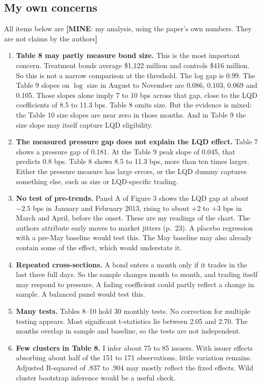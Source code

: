 \documentclass[10pt,a4paper]{article}
\newcommand{\MY}[1]{\textcolor{cmy}{\textbf{[MINE}: #1\textbf{]}}}
\begin{document}
\subsection{My own concerns}
All items below are \MY{my analysis, using the paper's own numbers. They are not claims by the authors}
\begin{enumerate}
\item \textbf{Table 8 may partly measure bond size.} This is the most important concern. Treatment bonds average \$1,122 million and controls \$416 million. So this is not a narrow comparison at the threshold. The log gap is 0.99. The Table 9 slopes on $\log$ size in August to November are 0.086, 0.103, 0.069 and 0.105. Those slopes alone imply 7 to 10 bps across that gap, close to the LQD coefficients of 8.5 to 11.3 bps. Table 8 omits size. But the evidence is mixed: the Table 10 size slopes are near zero in those months. And in Table 9 the size slope may itself capture LQD eligibility.
\item \textbf{The measured pressure gap does not explain the LQD effect.} Table 7 shows a pressure gap of 0.181. At the Table 9 peak slope of 0.045, that predicts 0.8 bps. Table 8 shows 8.5 to 11.3 bps, more than ten times larger. Either the pressure measure has large errors, or the LQD dummy captures something else, such as size or LQD-specific trading.
\item \textbf{No test of pre-trends.} Panel A of Figure 3 shows the LQD gap at about $-2.5$ bps in January and February 2013, rising to about $+2$ to $+3$ bps in March and April, before the onset. These are my readings of the chart. The authors attribute early moves to market jitters (p.~23). A placebo regression with a pre-May baseline would test this. The May baseline may also already contain some of the effect, which would understate it.
\item \textbf{Repeated cross-sections.} A bond enters a month only if it trades in the last three full days. So the sample changes month to month, and trading itself may respond to pressure. A fading coefficient could partly reflect a change in sample. A balanced panel would test this.
\item \textbf{Many tests.} Tables 8--10 hold 30 monthly tests. No correction for multiple testing appears. Most significant t-statistics lie between 2.05 and 2.70. The months overlap in sample and baseline, so the tests are not independent.
\item \textbf{Few clusters in Table 8.} I infer about 75 to 85 issuers. With issuer effects absorbing about half of the 151 to 171 observations, little variation remains. Adjusted R-squared of .837 to .904 may mostly reflect the fixed effects. Wild cluster bootstrap inference would be a useful check.

\end{enumerate}
\end{document}

